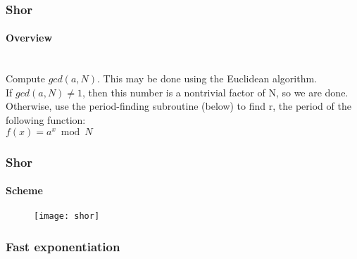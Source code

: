 \begin{frame}
	\frametitle{Shor}
		\framesubtitle{Overview}

		{\normalsize
		\hspace{0.5cm}{Pick a random number $a < N$.}\\
Compute $gcd(a, N)$. This may be done using the Euclidean algorithm.\\
If $gcd(a, N) \neq 1$, then this number is a nontrivial factor of N, so we are done.
Otherwise, use the period-finding subroutine (below) to find r, the period of the following function:\\
$f(x)=a^{x}{\bmod {N}}$
	}\\
		
		

\end{frame}

\begin{frame}
	\frametitle{Shor}
		\framesubtitle{Scheme}
	\vspace{0.5cm}
		\begin{figure}
		\centering
			\texttt{[image: shor]}
			\label{fig:shor shor}
		\end{figure}

\end{frame}

\begin{frame}
	\frametitle{Fast exponentiation}
		\framesubtitle{}

		{\normalsize
		\\
		}
		

\end{frame}


